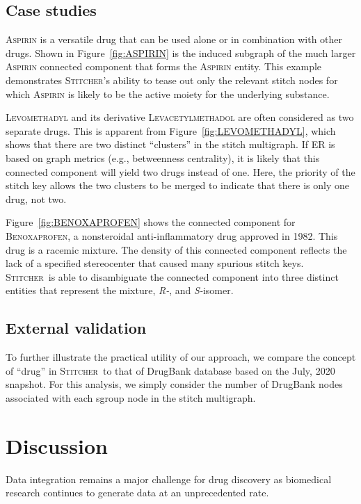 \documentclass{bmcart}
\newcommand\st{\textsc{Stitcher}}
\begin{document}
\subsection*{Case studies}
\textsc{Aspirin} is a versatile drug that can be used alone or in
combination with other drugs. Shown in Figure~\ref{fig:ASPIRIN} is the
induced subgraph of the much larger \textsc{Aspirin} connected component that
forms the \textsc{Aspirin} entity. This example demonstrates \st's
ability to tease out only the relevant stitch nodes for which
\textsc{Aspirin} is likely to be the active moiety for the underlying
substance. 

\textsc{Levomethadyl} and its derivative \textsc{Levacetylmethadol} are
often considered as two separate drugs. This is apparent from
Figure~\ref{fig:LEVOMETHADYL}, which shows that there are two distinct
``clusters'' in the stitch multigraph. If ER is based on
graph metrics (e.g., betweenness centrality), it is likely that this
connected component will yield two drugs instead of one. Here, the
priority of the stitch key allows the two clusters to be merged to
indicate that there is only one drug, not two.

Figure~\ref{fig:BENOXAPROFEN} shows the connected component for
\textsc{Benoxaprofen}, a nonsteroidal anti-inflammatory drug approved in
1982. This drug is a racemic mixture. The density of this connected
component reflects the lack of a specified stereocenter that
caused many spurious stitch keys. \st\ is able to disambiguate the
connected component into three distinct entities that represent the
mixture, \emph{R-}, and \emph{S-}isomer.

\subsection*{External validation}
To further illustrate the practical utility of our approach, we
compare the concept of ``drug'' in \st\ to that of DrugBank
\cite{wishart2018} database based on the July, 2020 snapshot. For this
analysis, we simply consider the number of DrugBank nodes associated
with each sgroup node in the stitch multigraph.

\section*{Discussion}
Data integration remains a major challenge for drug discovery as
biomedical research continues to generate data at an unprecedented
rate. 

\end{document}
